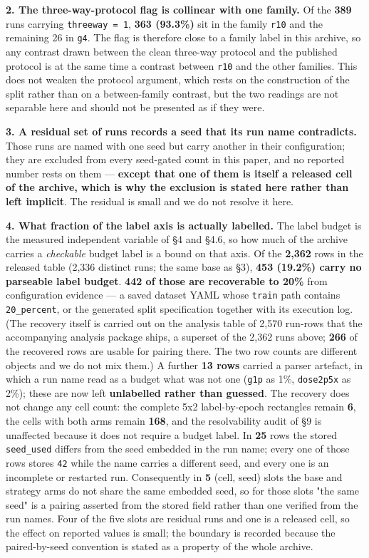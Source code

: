 \documentclass[pdflatex,sn-mathphys-ay]{sn-jnl}
\begin{document}
\textbf{2. The three-way-protocol flag is collinear with one family.} Of the \textbf{389} runs carrying \texttt{threeway = 1}, \textbf{363 (93.3\%)} sit in the family \texttt{r10} and the remaining 26 in \texttt{g4}. The flag is therefore close to a family label in this archive, so any contrast drawn between the clean three-way protocol and the published protocol is at the same time a contrast between \texttt{r10} and the other families. This does not weaken the protocol argument, which rests on the construction of the split rather than on a between-family contrast, but the two readings are not separable here and should not be presented as if they were.

\textbf{3. A residual set of runs records a seed that its run name contradicts.} Those runs are named with one seed but carry another in their configuration; they are excluded from every seed-gated count in this paper, and no reported number rests on them --- \textbf{except that one of them is itself a released cell of the archive, which is why the exclusion is stated here rather than left implicit}. The residual is small and we do not resolve it here.

\textbf{4. What fraction of the label axis is actually labelled.} The label budget is the measured independent variable of \S{}4 and \S{}4.6, so how much of the archive carries a \emph{checkable} budget label is a bound on that axis. Of the \textbf{2,362} rows in the released table (2,336 distinct runs; the same base as \S{}3), \textbf{453 (19.2\%) carry no parseable label budget}. \textbf{442 of those are recoverable to 20\%} from configuration evidence --- a saved dataset YAML whose \texttt{train} path contains \texttt{20\_percent}, or the generated split specification together with its execution log. (The recovery itself is carried out on the analysis table of 2,570 run-rows that the accompanying analysis package ships, a superset of the 2,362 runs above; \textbf{266} of the recovered rows are usable for pairing there. The two row counts are different objects and we do not mix them.) A further \textbf{13 rows} carried a parser artefact, in which a run name read as a budget what was not one (\texttt{g1p} as 1\%, \texttt{dose2p5x} as 2\%); these are now left \textbf{unlabelled rather than guessed}. The recovery does not change any cell count: the complete 5x2 label-by-epoch rectangles remain \textbf{6}, the cells with both arms remain \textbf{168}, and the resolvability audit of \S{}9 is unaffected because it does not require a budget label. In \textbf{25} rows the stored \texttt{seed\_used} differs from the seed embedded in the run name; every one of those rows stores \texttt{42} while the name carries a different seed, and every one is an incomplete or restarted run. Consequently in \textbf{5} (cell, seed) slots the base and strategy arms do not share the same embedded seed, so for those slots "the same seed" is a pairing asserted from the stored field rather than one verified from the run names. Four of the five slots are residual runs and one is a released cell, so the effect on reported values is small; the boundary is recorded because the paired-by-seed convention is stated as a property of the whole archive.
\end{document}
